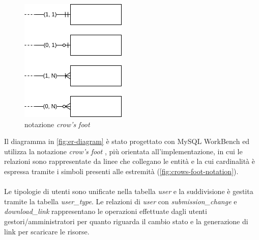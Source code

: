\begin{figure}
	\includegraphics[width=\linewidth]{assets/diagrams/crows-foot-notation.png}
	\cprotect\caption{notazione \textit{crow's foot}}
	\label{fig:crows-foot-notation}
\end{figure}

Il diagramma in \autoref{fig:er-diagram} è stato progettato con MySQL WorkBench
\cite{workbench:9-EER} ed utilizza la notazione \textit{crow's foot}
\cite{wiki:crows-foot}, più orientata all'implementazione, in cui le relazioni
sono rappresentate da linee che collegano le entità e la cui cardinalità è
espressa tramite i simboli presenti alle estremità (\autoref{fig:crows-foot-notation}).

\paragraph{}
Le tipologie di utenti sono unificate nella tabella \textit{user} e la
suddivisione è gestita tramite la tabella \textit{user\_type}. Le relazioni di
\textit{user} con \textit{submission\_change} e \textit{download\_link}
rappresentano le operazioni effettuate dagli utenti gestori/amministratori per
quanto riguarda il cambio stato e la generazione di link per scaricare le risorse.

